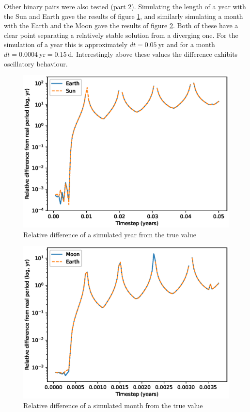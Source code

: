\documentclass[a4paper]{article}
\begin{document}
\clearpage
Other binary pairs were also tested (part 2).
Simulating the length of a year with the Sun and Earth gave the results of figure \ref{fig:2a_2},
and similarly simulating a month with the Earth and the Moon gave the results of figure \ref{fig:2b_2}.
Both of these have a clear point separating a relatively stable solution from a diverging one.
For the simulation of a year this is approximately $dt = 0.05 \ \text{yr}$ and for a month $dt = 0.0004 \ \text{yr} = 0.15 \ \text{d}$.
Interestingly above these values the difference exhibits oscillatory behaviour.

\begin{figure}[ht!]
\centering
\includegraphics[width=\textwidth]{fig_2a_2.eps}
\caption{Relative difference of a simulated year from the true value}
\label{fig:2a_2}
\end{figure}

\begin{figure}[ht!]
\centering
\includegraphics[width=\textwidth]{fig_2b_2.eps}
\caption{Relative difference of a simulated month from the true value}
\label{fig:2b_2}
\end{figure}
\end{document}
